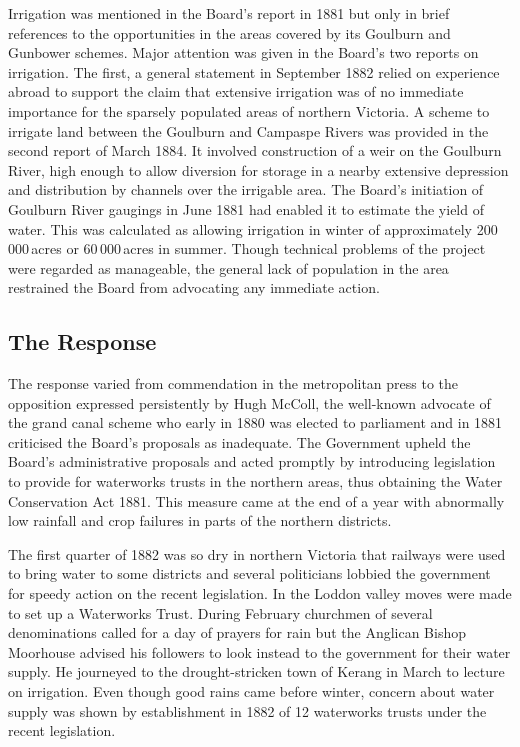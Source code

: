 Irrigation was mentioned in the Board's report in 1881 but only in
brief references to the opportunities in the areas covered by its
Goulburn and Gunbower schemes.  Major attention was given in the
Board's two reports on irrigation.  The first, a general statement in
September 1882 relied on experience abroad to support the claim that
extensive irrigation was of no immediate importance for the sparsely
populated areas of northern Victoria.  A scheme to irrigate land
between the Goulburn and Campaspe Rivers was provided in the second
report of March 1884. It involved construction of a weir on the
Goulburn River,   high
enough to allow diversion for storage in a nearby extensive depression
and distribution by channels over the irrigable area.  The Board's
initiation of Goulburn River gaugings in June 1881 had enabled it to
estimate the yield of water.  This was calculated as allowing
irrigation in winter of approximately 200\,000\,acres or
60\,000\,acres in summer.  Though technical problems of the project
were regarded as manageable, the general lack of population in the
area restrained the Board from advocating any immediate
action.

\subsection*{The Response}

The response varied from commendation in the metropolitan press to the
opposition expressed persistently by Hugh McColl, 
the well-known advocate of the grand canal scheme who early in 1880
was elected to parliament and in 1881 criticised the Board's proposals
as inadequate.  The Government upheld the Board's administrative
proposals and acted promptly by introducing legislation to provide for
waterworks trusts in the northern areas, thus obtaining the Water
Conservation Act 1881.  This
measure came at the end of a year with abnormally low rainfall and
crop failures in parts of the northern districts.

The first quarter of 1882 was so dry in northern Victoria that
railways were used to bring water to some districts and several
politicians lobbied the government for speedy action on the recent
legislation.  In the Loddon valley  moves were
made to set up a Waterworks Trust.  During February churchmen of
several denominations called for a day of prayers for rain but the
Anglican Bishop Moorhouse
advised his followers to look instead to the government for their
water supply.  He journeyed to the drought-stricken town of Kerang
 in
March to lecture on irrigation.  Even though good rains came before
winter, concern about water supply was shown by establishment in 1882
of 12 waterworks trusts under the recent
legislation.

